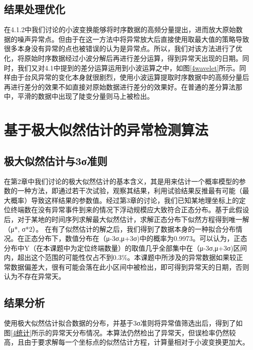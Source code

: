 \documentclass[a4paper,AutoFakeBold,oneside,12pt]{book}
\begin{document}
{{\subsection{结果处理优化}
	在4.1.2中我们讨论的小波变换能够将时序数据的高频分量提出，进而放大原始数据的噪声异常点。但由于在这一方法中将异常放大后直接使用取最大值的策略导致很多本身没有异常的点也被错误的认为是异常点。所以，我们对该方法进行了优化，将原始时序数据经过小波分解后再进行差分运算，得到异常天出现的日期。同时，我们又对4.1中提到的差分运算运用到小波运算之中，如图\ref{4wavelet}所示。同样由于台风异常的变化本身就很剧烈，使用小波运算提取时序数据中的高频分量后再进行差分的效果不如直接对原始数据进行差分的效果好。在普通的差分算法那中，平滑的数据中出现了陡变分量则马上被检出。


\section{基于极大似然估计的异常检测算法}
\subsection{极大似然估计与3σ准则}
	在第2章中我们讨论的极大似然估计的基本含义，其是用来估计一个概率模型的参数的一种方法，即通过若干次试验，观察其结果，利用试验结果反推最有可能（最大概率）导致这样结果的参数值。经过第3章的讨论，我们已知某地理坐标上的定位终端数在没有异常事件到来的情况下浮动规模应大致符合正态分布。基于此假设后，对于某地的时间序列求解最大似然估计，求解正态分布下似然方程得到唯一解（μ*, σ*2）。
	在有了似然估计的解之后，我们得到了数据本身的一种拟合分布情况。在正态分布下，数值分布在（μ-3σ,μ+3σ)中的概率为0.9973。可以认为，正态分布中Y（在本课题中为定位终端数量）的取值几乎全部集中在（μ-3σ,μ+3σ)区间内，超出这个范围的可能性仅占不到0.3\%。本课题中所涉及的异常数据如果较正常数据偏差大，很有可能会落在此小区间中被检出，即可得到异常天的日期，否则认为不存在异常天。

\subsection{结果分析}
	使用极大似然估计拟合数据的分布，并基于3σ准则将异常值筛选出后，得到了如图\ref{4统计}所示的异常天分布情况。本算法仍然检出了异常天，但误检率仍然较高，且由于要求解每一个坐标点的似然估计方程，计算量相对于小波变换更加大。


}}
\end{document}

